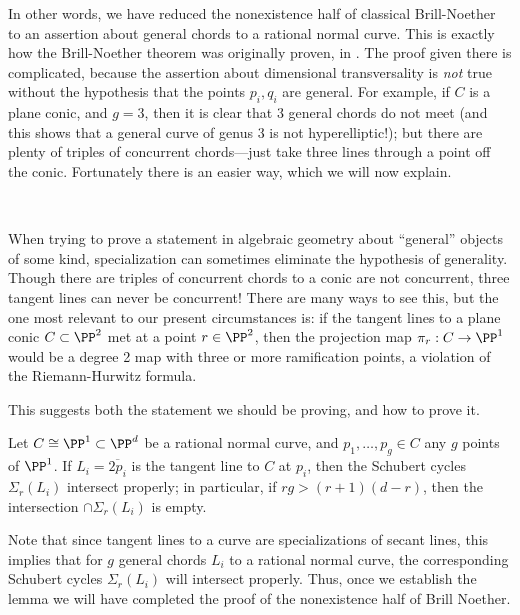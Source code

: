 In other words, we have reduced the nonexistence half of classical Brill-Noether to an assertion about general chords to a rational normal curve. This is exactly how
the Brill-Noether theorem was originally proven, in \cite{Griffiths-Harris-BN}. The proof given there is
complicated, because the assertion about dimensional transversality
is \emph{not} true without the hypothesis that the points $p_i,q_i$ are general. For example, if $C$ is a plane conic, and $g=3$, then it is clear that 3 general chords do not meet (and this shows that a general curve of genus 3 is not hyperelliptic!); but there are plenty of triples of concurrent chords---just take three lines through a point off the conic. Fortunately there is an easier way, which we will now explain.

\


When trying to prove a statement in algebraic geometry about ``general'' objects of some kind, specialization can sometimes eliminate the hypothesis of generality.
Though there are triples of concurrent chords to a conic are not concurrent, three tangent lines can never be concurrent! There are many ways to see this, but the one most relevant to our present circumstances is: if the tangent lines to a plane conic $C \subset \PP^2$ met at a point $r \in \PP^2$, then the projection map $\pi_r : C \to \PP^1$ would be a degree 2 map with three or more ramification points, a violation of the Riemann-Hurwitz formula.

This suggests both the statement we should be proving, and how to prove it. 

\begin{lemma}
Let $C \cong \PP^1 \subset \PP^d$ be a rational normal curve, and $p_1,\dots,p_g \in C$ any $g$ points of $\PP^1$. If $L_i = \overline{2p_i}$ is the tangent line to $C$ at $p_i$, then the Schubert cycles $\Sigma_r(L_i)$ intersect properly; in particular, if $rg > (r+1)(d-r)$, then the intersection $\cap \Sigma_r(L_i)$ is empty.
\end{lemma}

Note that since tangent lines to a curve are specializations of secant lines, this implies that for $g$ general chords $L_i$ to a rational normal curve, the corresponding Schubert cycles $\Sigma_r(L_i)$ will intersect properly. 
Thus, once we establish the lemma we will have completed the proof of the nonexistence half of Brill Noether.

